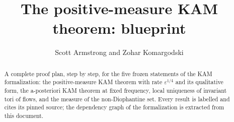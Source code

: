 \documentclass[11pt]{amsart}
\title{The positive-measure KAM theorem: blueprint}
\author{Scott Armstrong and Zohar Komargodski}
\begin{document}
\begin{abstract}
A complete proof plan, step by step, for the five frozen statements of the KAM formalization:
the positive-measure KAM theorem with rate $\varepsilon^{1/4}$ and its qualitative form, the
a-posteriori KAM theorem at fixed frequency, local uniqueness of invariant tori of flows, and the
measure of the non-Diophantine set. Every result is labelled and cites its pinned source; the
dependency graph of the formalization is extracted from this document.
\end{abstract}
\maketitle
\tableofcontents





\end{document}

